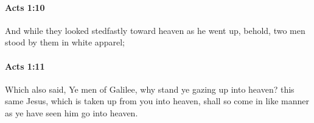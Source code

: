 		\paragraph{Acts 1:10} %
			\label{ACTS-1-10}

			And while they looked stedfastly toward heaven as he went up, behold, two men stood by them in white apparel;

			\begin{framed}
			\scriptsize
				\begin{compactdesc}
					\item[SBLG] 
				\end{compactdesc}
			\end{framed}

		\paragraph{Acts 1:11} %
			\label{ACTS-1-11}

			Which also said, Ye men of Galilee, why stand ye gazing up into heaven?  this same Jesus, which is taken up from you into heaven, shall so come in like manner as ye have seen him go into heaven.

